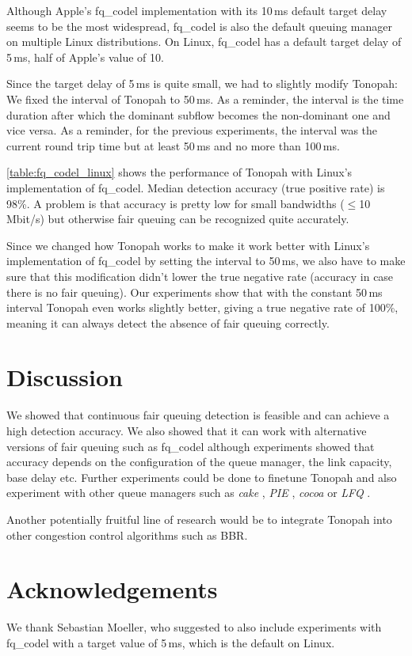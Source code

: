\documentclass[conference]{IEEEtran}
\begin{document}
Although Apple's fq\_codel implementation with its 10\,ms default target delay seems to be the most widespread, fq\_codel is also the default queuing manager on multiple Linux distributions. 
On Linux, fq\_codel has a default target delay of 5\,ms, half of Apple's value of 10. 

Since the target delay of 5\,ms is quite small, we had to slightly modify Tonopah: We fixed the interval of Tonopah to 50\,ms. 
As a reminder, the interval is the time duration after which the dominant subflow becomes the non-dominant one and vice versa. 
As a reminder, for the previous experiments, the interval was the current round trip time but at least 50\,ms and no more than 100\,ms. 

\autoref{table:fq_codel_linux} shows the performance of Tonopah with Linux's implementation of fq\_codel. Median detection accuracy (true positive rate) is 98\%. 
A problem is that accuracy is pretty low for small bandwidths ($\leq$10\,Mbit/s) but otherwise fair queuing can be recognized quite accurately. 

Since we changed how Tonopah works to make it work better with Linux's implementation of fq\_codel by setting the interval to 50\,ms, we also have to make sure that this modification didn't lower the true negative rate (accuracy in case there is no fair queuing). 
Our experiments show that with the constant 50\,ms interval Tonopah even works slightly better, giving a true negative rate of 100\%, meaning it can always detect the absence of fair queuing correctly.  

\section{Discussion}

We showed that continuous fair queuing detection is feasible and can achieve a high detection accuracy. 
We also showed that it can work with alternative versions of fair queuing such as fq\_codel although experiments showed that accuracy depends on the configuration of the queue manager, 
the link capacity, base delay etc. Further experiments could be done to finetune Tonopah and also experiment with other queue managers such as \textit{cake} \cite{hoiland-jorgensen_piece_2018}, \textit{PIE} \cite{pan_pie_2013}, \textit{cocoa} \cite{bachl_cocoa_2019} or \textit{LFQ} \cite{bachl_lfq_2020}. 

Another potentially fruitful line of research would be to integrate Tonopah into other congestion control algorithms such as BBR. 

\section*{Acknowledgements}

We thank Sebastian Moeller, who suggested to also include experiments with fq\_codel with a target value of 5\,ms, which is the default on Linux. 



\end{document}
